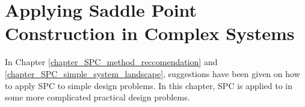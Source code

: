 \chapter{Applying Saddle Point Construction in Complex Systems} %
\label{chapter_4_complex_system_exploration} %
\graphicspath{ {./chapter-4/figures/} }  %
\captionsetup[figure]{labelfont=bf}
\captionsetup{margin=1.5em}
\captionsetup[table]{labelfont=bf}

\newcommand*\circled[1]{\tikz[baseline=(char.base)]{
            \node[shape=circle,draw,inner sep=0.5pt] (char) {#1};}}







In Chapter \ref{chapter_SPC_method_reccomendation}  and \ref{chapter_SPC_simple_system_landscape}, suggestions have been given on how to apply SPC to simple design problems. In this chapter, SPC is applied to in some more complicated practical design problems.

